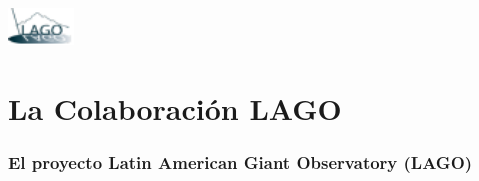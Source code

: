 \documentclass{beamer}
\begin{document}
\begin{frame}
				\includegraphics[height=0.13\textheight,width=0.13\textwidth]{logos/lagologo}

				\titlepage

\end{frame}

%
%

\section{La Colaboración LAGO}
\begin{frame}
				\frametitle{El proyecto {\color{red}L}atin {\color{red}A}merican
				{\color{red}G}iant {\color{red}O}bservatory (LAGO)}
				\begin{center}
				\end{center}
\end{frame} 
\end{document}

